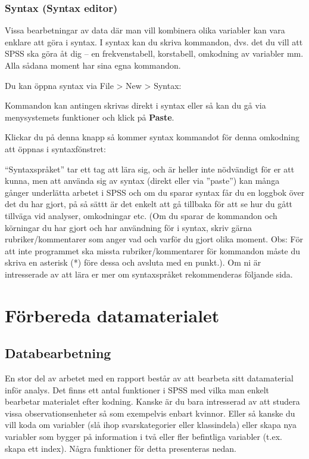 \documentclass[
]{book}
\begin{document}
\hypertarget{syntax-syntax-editor}{%
\section{Syntax (Syntax editor)}\label{syntax-syntax-editor}}

Vissa bearbetningar av data där man vill kombinera olika variabler kan vara enklare att göra i syntax. I syntax kan du skriva kommandon, dvs. det du vill att SPSS ska göra åt dig -- en frekvenstabell, korstabell, omkodning av variabler mm. Alla sådana moment har sina egna kommandon.

Du kan öppna syntax via File \textgreater{} New \textgreater{} Syntax:

Kommandon kan antingen skrivas direkt i syntax eller så kan du gå via menysystemets funktioner och klick på \textbf{Paste}.

Klickar du på denna knapp så kommer syntax kommandot för denna omkodning att öppnas i syntaxfönstret:

``Syntaxspråket'' tar ett tag att lära sig, och är heller inte nödvändigt för er att kunna, men att använda sig av syntax (direkt eller via ''paste'') kan många gånger underlätta arbetet i SPSS och om du sparar syntax får du en loggbok över det du har gjort, på så sättt är det enkelt att gå tillbaka för att se hur du gått tillväga vid analyser, omkodningar etc. (Om du sparar de kommandon och körningar du har gjort och har användning för i syntax, skriv gärna rubriker/kommentarer som anger vad och varför du gjort olika moment. Obs: För att inte programmet ska missta rubriker/kommentarer för kommandon måste du skriva en asterisk (*) före dessa och avsluta med en punkt.). Om ni är intresserade av att lära er mer om syntaxspråket rekommenderas följande sida.

\hypertarget{part-fuxf6rbereda-datamaterialet}{%
\part*{Förbereda datamaterialet}\label{part-fuxf6rbereda-datamaterialet}}

\hypertarget{databearbetning}{%
\chapter{Databearbetning}\label{databearbetning}}

En stor del av arbetet med en rapport består av att bearbeta sitt datamaterial inför analys. Det finns ett antal funktioner i SPSS med vilka man enkelt bearbetar materialet efter kodning. Kanske är du bara intresserad av att studera vissa observationsenheter så som exempelvis enbart kvinnor. Eller så kanske du vill koda om variabler (slå ihop svarskategorier eller klassindela) eller skapa nya variabler som bygger på information i två eller fler befintliga variabler (t.ex. skapa ett index). Några funktioner för detta presenteras nedan.
\end{document}
